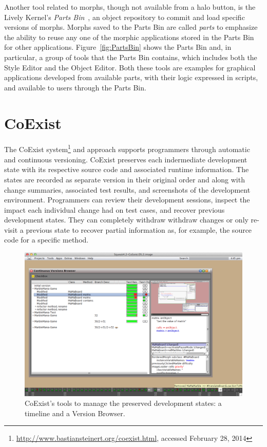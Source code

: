 Another tool related to morphs, though not available from a halo button, is the Lively Kernel's \emph{Parts Bin}~\cite{Lincke2012LPC}, an object repository to commit and load specific versions of morphs.
Morphs saved to the Parts Bin are called \emph{parts} to emphasize the ability to reuse any one of the morphic applications stored in the Parts Bin for other applications.
Figure~\ref{fig:PartsBin} shows the Parts Bin and, in particular, a group of tools that the Parts Bin contains, which includes both the Style Editor and the Object Editor.
Both these tools are examples for graphical applications developed from available parts, with their logic expressed in scripts, and available to users through the Parts Bin.


\section{CoExist}

The CoExist system\footnote{\url{http://www.bastiansteinert.org/coexist.html}, accessed February 28, 2014} and approach supports programmers through automatic and continuous versioning.
CoExist preserves each indermediate development state with its respective source code and associated runtime information.
The states are recorded as separate version in their original order and along with change summaries, associated test results, and screenshots of the development environment.
Programmers can review their development sessions, inspect the impact each individual change had on test cases, and recover previous development states.
They can completely withdraw withdraw changes or only re-visit a previous state to recover partial information as, for example, the source code for a specific method.

\begin{figure}[h]
    \centering
    \includegraphics[width=\textwidth]{figures/2_background/4_coexistTools.pdf}
    \caption{CoExist's tools to manage the preserved development states: a timeline and a Version Browser.}
    \label{fig:CoExist}
\end{figure}

